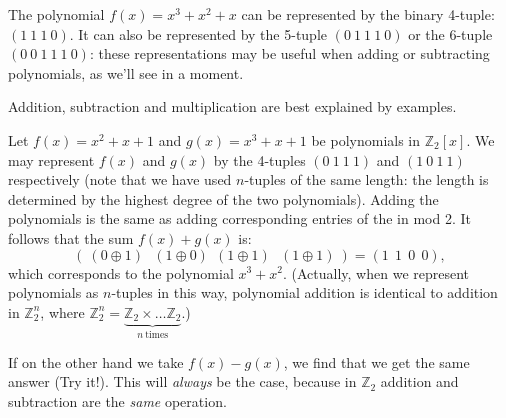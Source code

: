 \begin{example}{}
The polynomial $f(x) = x^3 + x^2 + x $ can be represented by the binary 4-tuple: $(1~1~1~0)$.  It can also be represented by the 5-tuple $(0~1~1~1~0)$ or the 6-tuple $(0~0~1~1~1~0)$: these representations may be useful when adding or subtracting polynomials, as we'll see in a moment.
\end{example}

Addition, subtraction and multiplication are best explained by examples.

\begin{example}{}
Let $f(x) = x^2 + x + 1$ and $g(x) = x^3   + x + 1$  be polynomials in $\mathbb{Z}_2[x]$.  We may represent $f(x)$ and $g(x)$  by the 4-tuples $(0~1~1~1)$ and $(1~0~1~1)$ respectively (note that we have used $n$-tuples of the same length: the length is determined by the highest degree of the two polynomials). Adding the polynomials is the same as adding corresponding entries of the in mod 2. It follows that the sum $f(x)+g(x)$ is:
\[\left( ~(0\oplus 1)~~~(1\oplus 0)~~(1 \oplus 1)~~~(1 \oplus 1)~\right) = (1~~1~~0~~0), \]
which corresponds to the polynomial $x^3   + x^2$. (Actually, when we represent polynomials as $n$-tuples in this way, polynomial addition is identical to addition in $\mathbb{Z}_2^n$, where $\mathbb{Z}_2^n = \underbrace{\mathbb{Z}_2 \times \ldots \mathbb{Z}_2}_{n~\text{times}}$.)

If on the other hand we take $f(x) - g(x)$, we find that we get the same answer (Try it!). This will \emph{always} be the case, because in $\mathbb{Z}_2$ addition and subtraction are the \emph{same} operation. 


\end{example}


